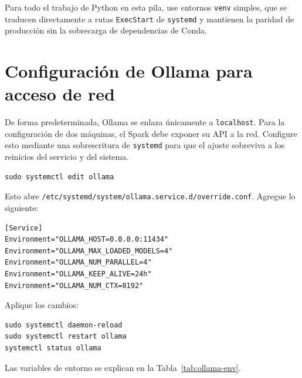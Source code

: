 Para todo el trabajo de Python en esta pila, use entornos \texttt{venv}
simples, que se traducen directamente a rutas \texttt{ExecStart} de
\texttt{systemd} y mantienen la paridad de producción sin la sobrecarga
de dependencias de Conda.

\section{Configuración de Ollama para acceso de red}
\label{sec:network-config}

De forma predeterminada, Ollama se enlaza únicamente a \texttt{localhost}.
Para la configuración de dos máquinas, el Spark debe exponer su API a la
red. Configure esto mediante una sobrescritura de \texttt{systemd} para
que el ajuste sobreviva a los reinicios del servicio y del sistema.

\begin{lstlisting}[style=bashstyle, caption={Crear una sobrescritura de systemd en el Spark}]
sudo systemctl edit ollama
\end{lstlisting}

Esto abre \texttt{/etc/systemd/system/ollama.service.d/override.conf}.
Agregue lo siguiente:

\begin{lstlisting}[style=bashstyle, caption={Sobrescritura de systemd para Ollama en el Spark}]
[Service]
Environment="OLLAMA_HOST=0.0.0.0:11434"
Environment="OLLAMA_MAX_LOADED_MODELS=4"
Environment="OLLAMA_NUM_PARALLEL=4"
Environment="OLLAMA_KEEP_ALIVE=24h"
Environment="OLLAMA_NUM_CTX=8192"
\end{lstlisting}

Aplique los cambios:

\begin{lstlisting}[style=bashstyle]
sudo systemctl daemon-reload
sudo systemctl restart ollama
systemctl status ollama
\end{lstlisting}

Las variables de entorno se explican en la Tabla~\ref{tab:ollama-env}.

